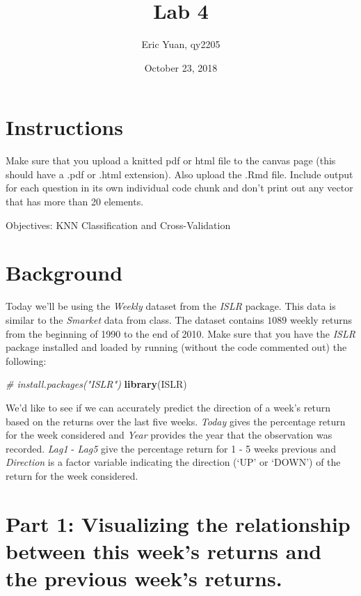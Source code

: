 \documentclass[]{article}
\title{Lab 4}
\author{Eric Yuan, qy2205}
\date{October 23, 2018}
\newenvironment{Shaded}{\begin{snugshade}}{\end{snugshade}}
\newcommand{\CommentTok}[1]{\textcolor[rgb]{0.56,0.35,0.01}{\textit{#1}}}
\newcommand{\KeywordTok}[1]{\textcolor[rgb]{0.13,0.29,0.53}{\textbf{#1}}}
\newcommand{\NormalTok}[1]{#1}
\begin{document}
\maketitle

\hypertarget{instructions}{%
\section{Instructions}\label{instructions}}

Make sure that you upload a knitted pdf or html file to the canvas page
(this should have a .pdf or .html extension). Also upload the .Rmd file.
Include output for each question in its own individual code chunk and
don't print out any vector that has more than 20 elements.

Objectives: KNN Classification and Cross-Validation

\hypertarget{background}{%
\section{Background}\label{background}}

Today we'll be using the \emph{Weekly} dataset from the \emph{ISLR}
package. This data is similar to the \emph{Smarket} data from class. The
dataset contains \(1089\) weekly returns from the beginning of 1990 to
the end of 2010. Make sure that you have the \emph{ISLR} package
installed and loaded by running (without the code commented out) the
following:

\begin{Shaded}
\begin{Highlighting}[]
\CommentTok{# install.packages("ISLR")}
\KeywordTok{library}\NormalTok{(ISLR)}
\end{Highlighting}
\end{Shaded}

We'd like to see if we can accurately predict the direction of a week's
return based on the returns over the last five weeks. \emph{Today} gives
the percentage return for the week considered and \emph{Year} provides
the year that the observation was recorded. \emph{Lag1} - \emph{Lag5}
give the percentage return for 1 - 5 weeks previous and \emph{Direction}
is a factor variable indicating the direction (`UP' or `DOWN') of the
return for the week considered.

\hypertarget{part-1-visualizing-the-relationship-between-this-weeks-returns-and-the-previous-weeks-returns.}{%
\section{Part 1: Visualizing the relationship between this week's
returns and the previous week's
returns.}\label{part-1-visualizing-the-relationship-between-this-weeks-returns-and-the-previous-weeks-returns.}}
\end{document}
